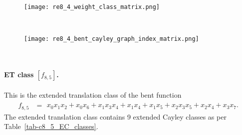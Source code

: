 \documentclass[12pt,a4paper]{article}
\begin{document}
\begin{figure}[!bhpt] %
\centering
\begin{minipage}{.48\textwidth}
  \centering
  \texttt{[image: re8\_4\_weight\_class\_matrix.png]}
  \label{fig:c8_4_weight_class_matrix}
\end{minipage}%
~~~~
\begin{minipage}{.48\textwidth}
  \centering
  \texttt{[image: re8\_4\_bent\_cayley\_graph\_index\_matrix.png]}
  \label{fig:c8_4_bent_cayley_graph_index_matrix}
\end{minipage}
\end{figure}
~
\paragraph*{ET class $[f_{8,5}]$.}
%
This is the extended translation class of the bent function
\small{}
\begin{align*}
f_{ 8 , 5 } &=
\begin{array}{l}
x_{0} x_{1} x_{2} + x_{0} x_{6} + x_{1} x_{3} x_{4} + x_{1} x_{4} + x_{1} x_{5} + x_{2} x_{3} x_{5}
+ x_{2} x_{4} + x_{3} x_{7}.
\end{array}
\end{align*}
\normalsize{}
The extended translation class contains 9 extended Cayley classes as per Table~\ref{tab-c8_5_EC_classes}.
\end{document}
